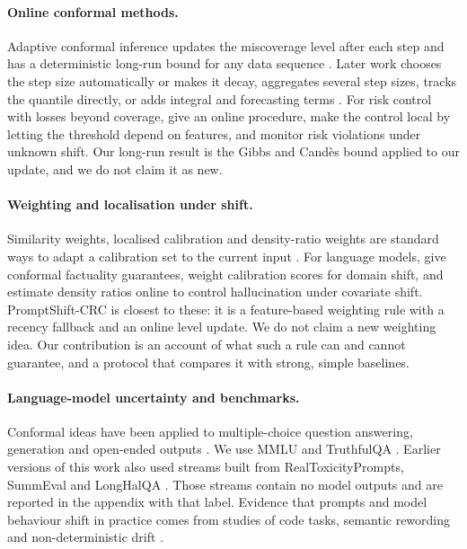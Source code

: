 \paragraph{Online conformal methods.}
Adaptive conformal inference updates the miscoverage level after each step and has a deterministic long-run bound for any data sequence \citep{gibbs2021adaptive}. Later work chooses the step size automatically or makes it decay, aggregates several step sizes, tracks the quantile directly, or adds integral and forecasting terms \citep{zaffran2022adaptive,gibbs2024online,bhatnagar2023improved,angelopoulos2024decaying,angelopoulos2023pid}. For risk control with losses beyond coverage, \citet{feldman2023online} give an online procedure, \citet{zecchin2024localized} make the control local by letting the threshold depend on features, and \citet{timans2025continuous} monitor risk violations under unknown shift. Our long-run result is the Gibbs and Cand\`es bound applied to our update, and we do not claim it as new.

\paragraph{Weighting and localisation under shift.}
Similarity weights, localised calibration and density-ratio weights are standard ways to adapt a calibration set to the current input \citep{guan2023localized,bastani2022practical,zecchin2025weighted}. For language models, \citet{mohri2024language} give conformal factuality guarantees, \citet{lin2026domain} weight calibration scores for domain shift, and \citet{hu2026cofact} estimate density ratios online to control hallucination under covariate shift. PromptShift-CRC is closest to these: it is a feature-based weighting rule with a recency fallback and an online level update. We do not claim a new weighting idea. Our contribution is an account of what such a rule can and cannot guarantee, and a protocol that compares it with strong, simple baselines.

\paragraph{Language-model uncertainty and benchmarks.}
Conformal ideas have been applied to multiple-choice question answering, generation and open-ended outputs \citep{kumar2023conformal,noorani2025missingmass}. We use MMLU and TruthfulQA \citep{lin2021truthfulqa}. Earlier versions of this work also used streams built from RealToxicityPrompts, SummEval and LongHalQA \citep{gehman2020realtoxicityprompts,fabbri2020summeval,qiu2024longhalqa}. Those streams contain no model outputs and are reported in the appendix with that label. Evidence that prompts and model behaviour shift in practice comes from studies of code tasks, semantic rewording and non-deterministic drift \citep{li2024codeuncertainty,li2025pbss,nicholson2026nondeterministic}.

